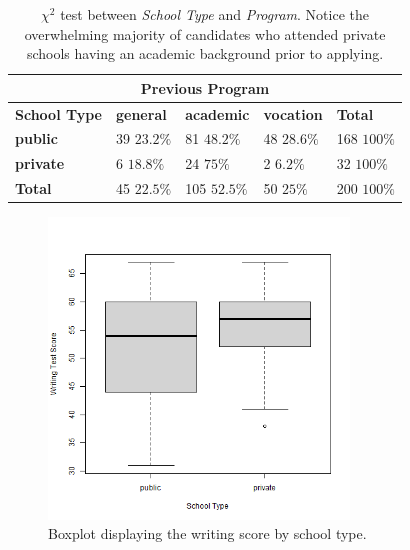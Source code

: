 \documentclass[10pt, a4paper]{article}
\begin{document}
	\begin{table}[h!]
		\centering
		\begin{tabular}
			{ |p{2cm} | p{1.2cm} p{1.2cm} p{1.2cm} | p{1.2cm} | }
			\hline
			\multicolumn{5}{|c|}{\textbf{Previous Program}}\\
			\hline
			\textbf{School Type} & \textbf{general} & \textbf{academic} & \textbf{vocation} & \textbf{Total}\\
			\hline
			\textbf{public} & \makecell{39 \\ $23.2\%$} & \makecell{81 \\ $48.2\%$} & \makecell{48 \\ $28.6\%$} & \makecell{168 \\ $100\%$} \\
			\textbf{private} & \makecell{6 \\ $18.8\%$} & \makecell{24 \\ $75\%$} & \makecell{2 \\ $6.2\%$} & \makecell{32 \\ $100\%$}\\
			\hline
			\textbf{Total} & \makecell{45 \\ $22.5\%$} & \makecell{105 \\ $52.5\%$} & \makecell{50 \\ $25\%$} & \makecell{200 \\ $100\%$}\\
			\hline
		\end{tabular}
		\caption{$\chi^2$ test between \textit{School Type} and \textit{Program}. Notice the overwhelming majority of candidates who attended private schools having an academic background prior to applying.}
		\label{tab::chisq}
	\end{table}
	
	\begin{figure}[h!]
		\includegraphics[width=8cm]{write_schtyp_boxplot.png}
		\centering
		\caption{Boxplot displaying the writing score by school type.}
		\label{fig::write_schtyp_boxplot}
	\end{figure}
	
\end{document}
